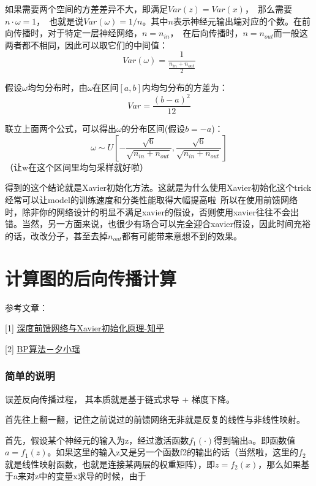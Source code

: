 如果需要两个空间的方差差异不大，即满足$Var(z) = Var(x)$，　那么需要$n \cdot \omega = 1$，　也就是说$Var(\omega) = 1 / n$。其中$n$表示神经元输出端对应的个数。在前向传播时，对于特定一层神经网络，$n = n_{in}$，　在后向传播时，$n = n_{out}$而一般这两者都不相同，因此可以取它们的中间值：
\begin{displaymath}
Var(\omega) = \frac{1}{\frac{n_{in} + n_{out}}{2}}
\end{displaymath}

假设$\omega$均匀分布时，由$\omega$在区间$[a, b]$内均匀分布的方差为：
\begin{displaymath}
Var = \frac{(b - a)^2}{12}
\end{displaymath}

联立上面两个公式，可以得出$\omega$的分布区间(假设$b = -a$)：
\begin{displaymath}
\omega \sim U\left[ -\frac{\sqrt{6}}{\sqrt{n_{in} + n_{out}}}, \frac{\sqrt{6}}{\sqrt{n_{in} + n_{out}}}  \right]
\end{displaymath}
（让w在这个区间里均匀采样就好啦）

得到的这个结论就是Xavier初始化方法。这就是为什么使用Xavier初始化这个trick经常可以让model的训练速度和分类性能取得大幅提高啦~所以在使用前馈网络时，除非你的网络设计的明显不满足xavier的假设，否则使用xavier往往不会出错。当然，另一方面来说，也很少有场合可以完全迎合xavier假设，因此时间充裕的话，改改分子，甚至去掉$n_{out}$都有可能带来意想不到的效果。


\section{计算图的后向传播计算}

参考文章：

[1] \href{https://zhuanlan.zhihu.com/p/27919794}{深度前馈网络与Xavier初始化原理-知乎}

[2] \href{https://mp.weixin.qq.com/s?__biz=MzIwNzc2NTk0NQ==&mid=2247484344&idx=1&sn=92ff388d93088ea6461023b376860ce7&chksm=970c2b6ea07ba2782da5de78b23b78b267b4b0fc4454e76256134cfc9d6aa5416e0bd4c14097&scene=21#wechat_redirect}{BP算法－夕小瑶}

\subsubsection{简单的说明}
误差反向传播过程， 其本质就是基于链式求导 + 梯度下降。

首先往上翻一翻，记住之前说过的前馈网络无非就是反复的线性与非线性映射。

首先，假设某个神经元的输入为z，经过激活函数$f_1(\cdot)$得到输出a。即函数值$a=f_1(z)$。如果这里的输入z又是另一个函数f2的输出的话（当然啦，这里的$f_2$就是线性映射函数，也就是连接某两层的权重矩阵），即$z=f_2(x)$，那么如果基于a来对z中的变量x求导的时候，由于 


